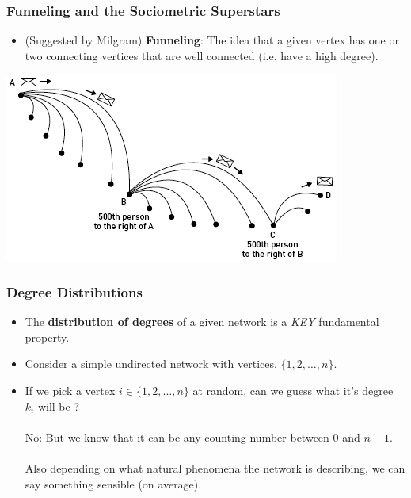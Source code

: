 \documentclass[smaller]{beamer}
\begin{document}
\begin{frame} 
\frametitle{Funneling and the Sociometric Superstars} 
\begin{itemize}
\item (Suggested by Milgram)  {\bf Funneling}: The idea that a given vertex has one or two connecting vertices
that are well connected (i.e. have a high degree). 
\end{itemize}
\includegraphics[scale=0.5]{figures/funneling.png} 
\end{frame}

\begin{frame} 
\frametitle{Degree Distributions} 
\begin{itemize}
\item The {\bf distribution of degrees} of a given network is a {\it KEY} fundamental property. 
\item Consider a simple undirected network with vertices, $\{1, 2, \dots, n\}$. 
\item If we pick a vertex $i \in \{1, 2, \dots, n\}$ at random, can we guess what it's degree $k_i$ will be ?\\
${}_{}$\\
No: But we know that it can be any counting number between 0 and $n-1$.\\
${}_{}$\\
Also depending on what natural phenomena the network is describing, we can 
say something sensible (on average).
\end{itemize}
\end{frame}
\end{document}
